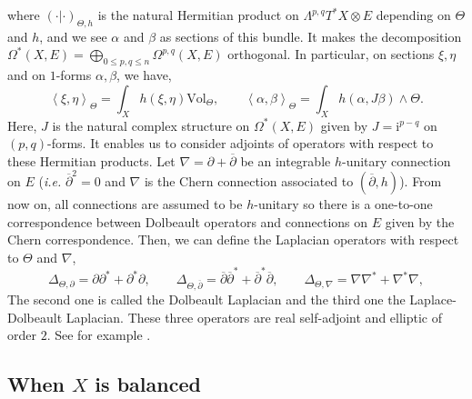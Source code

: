 \documentclass{article}
\theoremstyle{remark}
\theoremstyle{definition}
\newcommand{\Vol}{\mathrm{Vol}}
\renewcommand{\i}{\boldsymbol{\mathrm{i}}}
\newcommand{\scal}[2]{\left< #1,#2 \right>}
\newcommand{\dbar}{\overline{\partial}}
\renewcommand{\leq}{\leqslant}
\begin{document}
where $(\cdot|\cdot)_{\Theta,h}$ is the natural Hermitian product on $\Lambda^{p,q}T^*X \otimes E$ depending on $\Theta$ and $h$, and we see $\alpha$ and $\beta$ as sections of this bundle. It makes the decomposition $\Omega^*(X,E) = \bigoplus_{0 \leq p,q \leq n} \Omega^{p,q}(X,E)$ orthogonal. In particular, on sections $\xi,\eta$ and on $1$-forms $\alpha,\beta$, we have,
$$
\scal{\xi}{\eta}_\Theta = \int_X h(\xi,\eta)\Vol_\Theta, \qquad \scal{\alpha}{\beta}_\Theta = \int_X h(\alpha,J\beta) \wedge \Theta.
$$
Here, $J$ is the natural complex structure on $\Omega^*(X,E)$ given by $J = \i^{p - q}$ on $(p,q)$-forms. It enables us to consider adjoints of operators with respect to these Hermitian products. Let $\nabla = \partial + \dbar$ be an integrable $h$-unitary connection on $E$ (\textit{i.e.} $\dbar^2 = 0$ and $\nabla$ is the Chern connection associated to $(\dbar,h)$). From now on, all connections are assumed to be $h$-unitary so there is a one-to-one correspondence between Dolbeault operators and connections on $E$ given by the Chern correspondence. Then, we can define the Laplacian operators with respect to $\Theta$ and $\nabla$,
$$
\Delta_{\Theta,\partial} = \partial\partial^* + \partial^*\partial, \qquad \Delta_{\Theta,\dbar} = \dbar\dbar^* + \dbar^*\dbar, \qquad \Delta_{\Theta,\nabla} = \nabla\nabla^* + \nabla^*\nabla,
$$
The second one is called the Dolbeault Laplacian and the third one the Laplace-Dolbeault Laplacian. These three operators are real self-adjoint and elliptic of order $2$. See for example \cite[Definition (3.14)]{Demailly}.

\subsection{When $X$ is balanced}
\end{document}
